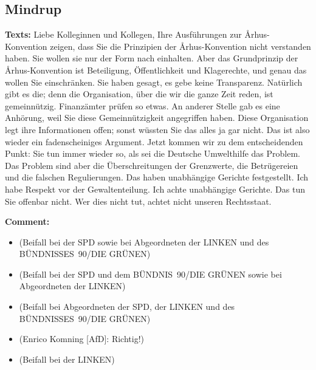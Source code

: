 \documentclass{article}
\begin{document}
\subsection{Mindrup}
\noindent\textbf{Texts:} Liebe Kolleginnen und Kollegen, Ihre Ausführungen zur Århus-Konvention zeigen, dass Sie die Prinzipien der Århus-Konvention nicht verstanden haben.  Sie wollen sie nur der Form nach einhalten. Aber das Grundprinzip der Århus-Konvention ist Beteiligung, Öffentlichkeit und Klagerechte, und genau das wollen Sie einschränken. Sie haben gesagt, es gebe keine Transparenz. Natürlich gibt es die; denn die Organisation, über die wir die ganze Zeit reden, ist gemeinnützig. Finanzämter prüfen so etwas. An anderer Stelle gab es eine Anhörung, weil Sie diese Gemeinnützigkeit angegriffen haben. Diese Organisation legt ihre Informationen offen; sonst wüssten Sie das alles ja gar nicht. Das ist also wieder ein fadenscheiniges Argument. Jetzt kommen wir zu dem entscheidenden Punkt: Sie tun immer wieder so, als sei die Deutsche Umwelthilfe das Problem.  Das Problem sind aber die Überschreitungen der Grenzwerte, die Betrügereien und die falschen Regulierungen. Das haben unabhängige Gerichte festgestellt.  Ich habe Respekt vor der Gewaltenteilung. Ich achte unabhängige Gerichte. Das tun Sie offenbar nicht. Wer dies nicht tut, achtet nicht unseren Rechtsstaat.  

\noindent\textbf{Comment:}
\begin{itemize}
    \setlength\itemsep{-3pt}
    \item (Beifall bei der SPD sowie bei Abgeordneten der LINKEN und des BÜNDNISSES 90/DIE GRÜNEN)
    \setlength\itemsep{-3pt}
    \item (Beifall bei der SPD und dem BÜNDNIS 90/DIE GRÜNEN sowie bei Abgeordneten der LINKEN)
    \setlength\itemsep{-3pt}
    \item (Beifall bei Abgeordneten der SPD, der LINKEN und des BÜNDNISSES 90/DIE GRÜNEN)
    \setlength\itemsep{-3pt}
    \item (Enrico Komning [AfD]: Richtig!)
    \setlength\itemsep{-3pt}
    \item (Beifall bei der LINKEN)
\end{itemize}
\end{document}
